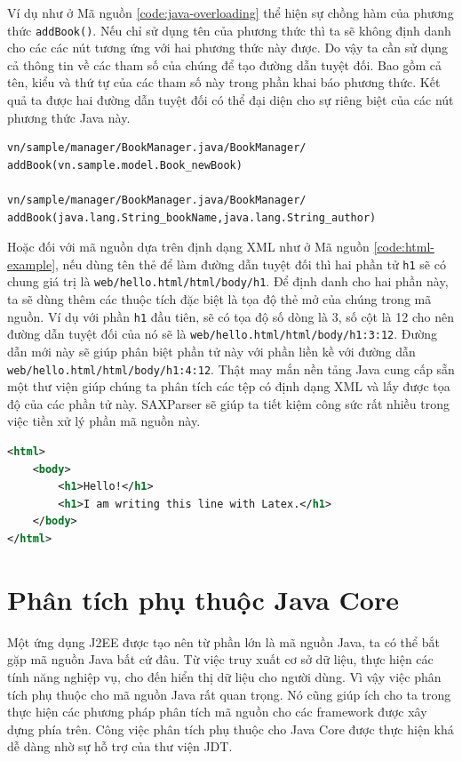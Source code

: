 \documentclass[12pt]{report}
\begin{document}
Ví dụ như ở Mã nguồn \ref{code:java-overloading} thể hiện sự chồng hàm của phương thức \texttt{addBook()}. Nếu chỉ sử dụng tên của phương thức thì ta sẽ không định danh cho các các nút tương ứng với hai phương thức này được. Do vậy ta cần sử dụng cả thông tin về các tham số của chúng để tạo đường dẫn tuyệt đối. Bao gồm cả tên, kiểu và thứ tự của các tham số này trong phần khai báo phương thức. Kết quả ta được hai đường dẫn tuyệt đối có thể đại diện cho sự riêng biệt của các nút phương thức Java này.

\begin{verbatim}
vn/sample/manager/BookManager.java/BookManager/
addBook(vn.sample.model.Book_newBook)

vn/sample/manager/BookManager.java/BookManager/
addBook(java.lang.String_bookName,java.lang.String_author)
\end{verbatim}

Hoặc đối với mã nguồn dựa trên định dạng XML như ở Mã nguồn \ref{code:html-example}, nếu dùng tên thẻ để làm đường dẫn tuyệt đối thì hai phần tử \texttt{h1} sẽ có chung giá trị là \texttt{web/hello.html/html/body/h1}. Để định danh cho hai phần này, ta sẽ dùng thêm các thuộc tích đặc biệt là tọa độ thẻ mở của chúng trong mã nguồn. Ví dụ với phần \texttt{h1} đầu tiên, sẽ có tọa độ số dòng là 3, số cột là 12 cho nên đường dẫn tuyệt đối của nó sẽ là \texttt{web/hello.html/html/body/h1:3:12}. Đường dẫn mới này sẽ giúp phân biệt phần tử này với phần liền kề với đường dẫn \texttt{web/hello.html/html/body/h1:4:12}. Thật may mắn nền tảng Java cung cấp sẵn một thư viện giúp chúng ta phân tích các tệp có định dạng XML và lấy được tọa độ của các phần tử này. SAXParser sẽ giúp ta tiết kiệm công sức rất nhiều trong việc tiền xử lý phần mã nguồn này.

\begin{lstlisting}[language=XML,
caption={Ví dụ mã nguồn HTML},label={code:html-example}]
<html>
	<body>
		<h1>Hello!</h1>
		<h1>I am writing this line with Latex.</h1>
	</body>
</html>
\end{lstlisting}

\section{Phân tích phụ thuộc Java Core}
Một ứng dụng J2EE được tạo nên từ phần lớn là mã nguồn Java, ta có thể bắt gặp mã nguồn Java bất cứ đâu. Từ việc truy xuất cơ sở dữ liệu, thực hiện các tính năng nghiệp vụ, cho đến hiển thị dữ liệu cho người dùng. Vì vậy việc phân tích phụ thuộc cho mã nguồn Java rất quan trọng. Nó cũng giúp ích cho ta trong thực hiện các phương pháp phân tích mã nguồn cho các framework được xây dựng phía trên. Công việc phân tích phụ thuộc cho Java Core được thực hiện khá dễ dàng nhờ sự hỗ trợ của thư viện JDT.
\end{document}
